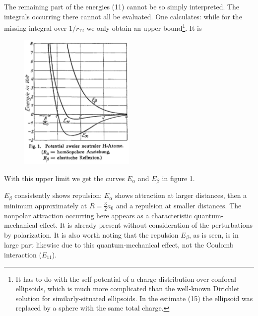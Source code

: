 \begin{paper}{1}
The remaining part of the energies (11) cannot be so simply interpreted. The integrals occurring there cannot all be evaluated. One calculates:
while for the missing integral over $1/r_{12}$ we only obtain an upper bound\footnote{It has to do with the self-potential of a charge distribution over confocal ellipsoids, which is much more complicated than the well-known Dirichlet solution for similarly-situated ellipsoids. In the estimate (15) the ellipsoid was replaced by a sphere with the same total charge.}. It is
\begin{figure}
		\includegraphics[width=0.5\textwidth]{fig1}
\end{figure}

With this upper limit we get the curves $E_\alpha$ and $E_\beta$ in figure 1.

$E_\beta$ consistently shows repulsion; $E_\alpha$ shows attraction at larger distances, then a minimum approximately at $R=\frac{3}{2}a_0$ and a repulsion at smaller distances. The nonpolar attraction occurring here appears as a characteristic quantum-mechanical effect. It is already present without consideration of the perturbations by polarization. It is also worth noting that the repulsion $E_\beta$, as is seen, is in large part likewise due to this quantum-mechanical effect, not the Coulomb interaction ($E_{11}$).


\end{paper}
